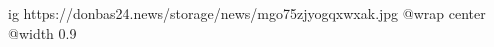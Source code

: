  
 
 
 
 

\ifcmt
  ig https://donbas24.news/storage/news/mgo75zjyogqxwxak.jpg
  @wrap center
  @width 0.9
\fi
